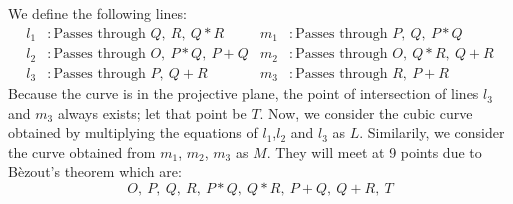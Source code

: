 We define the following lines:
\begin{align*}
  l_1 &\colon \text{Passes through }Q,\ R,\ Q*R   & m_1 &\colon \text{Passes through }P,\ Q,\ P*Q \\
  l_2 &\colon \text{Passes through }O,\ P*Q,\ P+Q & m_2 &\colon \text{Passes through }O,\ Q*R,\ Q+R \\
  l_3 &\colon \text{Passes through }P,\ Q+R       & m_3 &\colon \text{Passes through }R,\ P+R
\end{align*}
Because the curve is in the projective plane, the point of intersection of lines $l_3$ and $m_3$ always exists; let that point be $T$.
Now, we consider the cubic curve obtained by multiplying the equations of $l_1$,$l_2$ and $l_3$ as $L$.
Similarily, we consider the curve obtained from $m_1$, $m_2$, $m_3$ as $M$.
They will  meet at 9 points due to B\`ezout's theorem \cite[Thm.~A.1]{silver} which are:
\[O,\ P,\ Q,\ R,\ P*Q,\ Q*R,\ P+Q,\ Q+R,\ T\]
